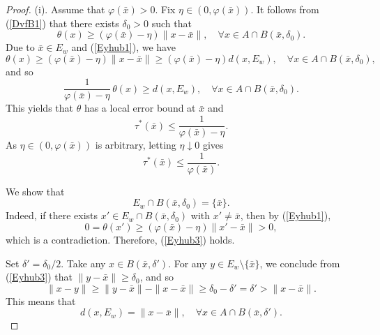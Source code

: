 \documentclass[11pt]{article}
\begin{document}
  \begin{proof}   (i).  Assume that $	\varphi(\bar{x}) > 0$.    Fix $\eta \in (0, 	\varphi(\bar{x}))$.  It follows from  (\ref{DvfB1})  that    there exists $\delta_0 > 0$ such that
  	 \begin{equation}\label{Eyhub1}
  \theta(x) \ge (\varphi(\bar{x}) - \eta) \|x - \bar{x}\|,  \quad	\forall x \in A \cap B(\bar{x}, \delta_0). 
  \end{equation}
  Due to $\bar{x} \in E_w$ and (\ref{Eyhub1}), we have 
  $$ \theta(x) \ge (\varphi(\bar{x}) - \eta) \|x - \bar{x}\|  \ge  (\varphi(\bar{x}) - \eta) d(x, E_w) ,  \quad	\forall x \in A \cap B(\bar{x}, \delta_0), $$
  and so 
  $$ \frac{1}{	\varphi(\bar{x}) - \eta} \, \theta(x)    \ge   d(x, E_w) ,  \quad	\forall x \in A \cap B(\bar{x}, \delta_0). $$
 This yields  that $\theta$ has a  local error bound at $\bar x$ and 
 \[
 \tau^*(\bar{x}) \le \frac{1}{	\varphi(\bar{x}) - \eta}.
 \]
 As $\eta \in (0, 	\varphi(\bar{x}))$ is arbitrary, letting $\eta \downarrow 0$ gives
   \begin{equation}\label{Eyhub2}
 \tau^*(\bar{x}) \le \frac{1}{	\varphi(\bar{x})}.  
  \end{equation}
  
  We show that 
   \begin{equation}\label{Eyhub3}
  	E_w \cap B(\bar x, \delta_0) = \{\bar x\}.
  \end{equation}
  	Indeed, if there exists $x' \in E_w \cap B(\bar x, \delta_0)$ with $x' \neq \bar x$, then by  (\ref{Eyhub1}),
  \[
  0 = \theta(x') \ge  (	\varphi(\bar{x}) - \eta) \|x' - \bar x\| > 0,
  \]
which is  a contradiction. Therefore,  (\ref{Eyhub3}) holds.
  
   Set $\delta' = \delta_0 /2$. Take any $x \in B(\bar{x}, \delta')$. For any $y \in E_w \setminus \{\bar{x}\}$, we conclude from  (\ref{Eyhub3})  that $\|y - \bar{x}\| \ge \delta_0$,  and  so
  \[
  \|x - y\| \ge \|y - \bar{x}\| - \|x - \bar{x}\| \ge \delta_0 - \delta' = \delta' > \|x - \bar{x}\|.
  \]
  This means that
    \begin{equation}\label{Eyhub4}
  d(x, E_w) = \|x - \bar{x}\|,   \quad	\forall  x \in A \cap B(\bar{x}, \delta').
  \end{equation}
  

\end{proof}
\end{document}

